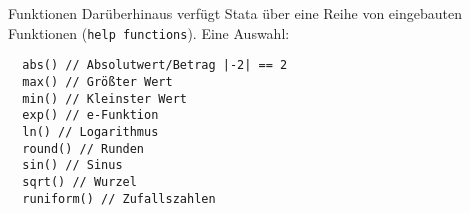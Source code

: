 \begin{frame}[fragile]{Funktionen} 
Darüberhinaus verfügt Stata über eine Reihe von eingebauten Funktionen (\texttt{help functions}).
Eine Auswahl:
\begin{lstlisting}
  abs() // Absolutwert/Betrag |-2| == 2
  max() // Größter Wert
  min() // Kleinster Wert
  exp() // e-Funktion
  ln() // Logarithmus
  round() // Runden
  sin() // Sinus
  sqrt() // Wurzel
  runiform() // Zufallszahlen
\end{lstlisting}
\end{frame}